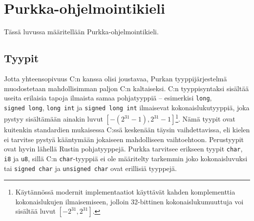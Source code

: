 \section{Purkka-ohjelmointikieli}
\label{sec:purkka}

Tässä luvussa määritellään Purkka-ohjelmointikieli.

\subsection{Tyypit}

Jotta yhteensopivuus C:n kanssa olisi joustavaa, Purkan tyyppijärjestelmä
muodostetaan mahdollisimman paljon C:n kaltaiseksi. C:n tyyppisyntaksi sisältää
useita erilaisia tapoja ilmaista samaa pohjatyyppiä -- esimerkisi
\texttt{long}, \texttt{signed~long}, \texttt{long~int} ja
\texttt{signed~long~int} ilmaisevat kokonaislukutyyppiä, joka pystyy
sisältämään ainakin luvut $[-(2^{31} - 1), 2^{31}-1]$\footnote{Käytännössä
modernit implementaatiot käyttävät kahden komplementtia kokonaislukujen
ilmaisemiseen, jolloin 32-bittinen kokonaislukumuuttuja voi sisältää luvut
$[-2^{31}, 2^{31}]$.}\citationneeded. Nämä tyypit ovat kuitenkin standardien
mukaisessa C:ssä keskenään täysin vaihdettavissa, eli kielen ei tarvitse pystyä
kääntymään jokaiseen mahdolliseen vaihtoehtoon. Perustyypit ovat hyvin lähellä
Rustin pohjatyyppejä\citationneeded. Purkka tarvitsee erikseen tyypit
\texttt{char}, \texttt{i8} ja \texttt{u8}, sillä C:n \texttt{char}-tyyppiä ei
ole määritelty tarkemmin joko kokonaisluvuksi tai 
\texttt{signed char} ja \texttt{unsigned char} ovat erillisiä tyyppejä.

